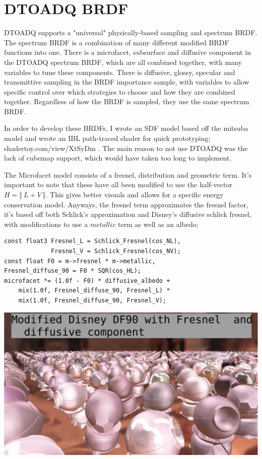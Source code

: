 \documentclass{article}
\begin{document}
  \section{DTOADQ BRDF}
  DTOADQ supports a "universal" physically-based sampling and spectrum BRDF. The spectrum BRDF is a combination of many different modified BRDF functions into one. There is a microfacet, subsurface and diffusive component in the DTOADQ spectrum BRDF, which are all combined together, with many variables to tune these components. There is diffusive, glossy, specular and transmittive sampling in the BRDF importance sample, with variables to allow specific control over which strategies to choose and how they are combined together. Regardless of how the BRDF is sampled, they use the same spectrum BRDF.
  
  In order to develop these BRDFs, I wrote an SDF model based off the mitsuba model and wrote an IBL path-traced shader for quick prototyping; shadertoy.com/view/XtSyDm . The main reason to not use DTOADQ was the lack of cubemap support, which would have taken too long to implement.
  
  The Microfacet model consists of a fresnel, distribution and geometric term. It's important to note that these have all been modified to use the half-vector $H = \Vert\:L+V\:\Vert$. This gives better visuals and allows for a specific energy conservation model. Anyways, the fresnel term approximates the fresnel factor, it's based off both Schlick's approximation and Disney's diffusive schlick fresnel, with modifications to use a $metallic$ term as well as an albedo;
  \begin{lstlisting}
const float3 Fresnel_L = Schlick_Fresnel(cos_NL),
             Fresnel_V = Schlick_Fresnel(cos_NV);
const float F0 = m->fresnel * m->metallic,
Fresnel_diffuse_90 = F0 * SQR(cos_HL);
microfacet *= (1.0f - F0) * diffusive_albedo +
    mix(1.0f, Fresnel_diffuse_90, Fresnel_L) *
    mix(1.0f, Fresnel_diffuse_90, Fresnel_V);
  \end{lstlisting}
  \includegraphics[scale=0.20]{fresnel}
  
\end{document}

